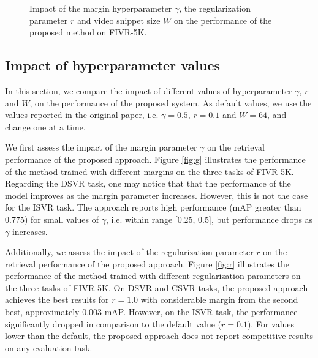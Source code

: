 \documentclass[10pt,twocolumn,letterpaper]{article}
\begin{document}
\begin{figure*}[t]
\centering
{}\hspace{0.1cm}
\hspace{0.1cm}
\caption{Impact of the margin hyperparameter $\gamma$, the regularization parameter $r$ and video snippet size $W$ on the performance of the proposed method on FIVR-5K.}
\label{fig:fivr_pr_curves}
\end{figure*}

\subsection{Impact of hyperparameter values}
In this section, we compare the impact of different values of hyperparameter $\gamma$, $r$ and $W$, on the performance of the proposed system. As default values, we use the values reported in the original paper, i.e. $\gamma = 0.5$, $r=0.1$ and $W=64$, and change one at a time.

We first assess the impact of the margin parameter $\gamma$ on the retrieval performance of the proposed approach. Figure \ref{fig:g} illustrates the performance of the method trained with different margins on the three tasks of FIVR-5K. Regarding the DSVR task, one may notice that that the performance of the model improves as the margin parameter increases. However, this is not the case for the ISVR task. The approach reports high performance (mAP greater than 0.775) for small values of $\gamma$, i.e. within range [0.25, 0.5], but performance drops as $\gamma$ increases.



Additionally, we assess the impact of the regularization parameter $r$ on the retrieval performance of the proposed approach. Figure \ref{fig:r} illustrates the performance of the method trained with different regularization parameters on the three tasks of FIVR-5K. On DSVR and CSVR tasks, the proposed approach achieves the best results for $r=1.0$ with considerable margin from the second best, approximately 0.003 mAP. However, on the ISVR task, the performance significantly dropped in comparison to the default value ($r=0.1$). For values lower than the default, the proposed approach does not report competitive results on any evaluation task.
\end{document}
